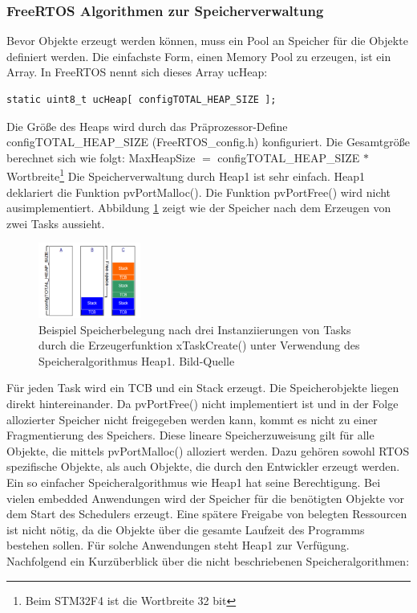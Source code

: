 \subsubsection{FreeRTOS Algorithmen zur Speicherverwaltung}
Bevor Objekte erzeugt werden können, muss ein Pool an Speicher für die Objekte definiert werden. Die einfachste Form, einen Memory Pool zu erzeugen, ist ein Array. In FreeRTOS nennt sich dieses Array ucHeap:
\begin{lstlisting}[numbers = none]
static uint8_t ucHeap[ configTOTAL_HEAP_SIZE ];
\end{lstlisting}
Die Größe des Heaps wird durch das Prä\-pro\-zes\-sor-Define configTOTAL\_HEAP\_SIZE (FreeRTOS\_config.h) konfiguriert. Die Gesamtgröße berechnet sich wie folgt:
\newline
\newline
MaxHeapSize $=$ configTOTAL\_HEAP\_SIZE $\ast$ Wortbreite\footnote{Beim STM32F4 ist die Wortbreite 32 bit} 
\newline
\newline
Die Speicherverwaltung durch Heap1 ist sehr einfach.\newline 
Heap1 deklariert die Funktion pvPortMalloc(). Die Funktion pvPortFree() wird nicht ausimplementiert. Abbildung \ref{fig:Heap1} zeigt wie der Speicher nach dem Erzeugen von zwei Tasks aussieht. 
\begin{figure}[htb]
	\centering
		\includegraphics[width=0.3\textwidth]{Pictures/FreeRTOSOrg/heap1Alg.png}
	\caption{Beispiel Speicherbelegung nach drei Instanziierungen von Tasks durch die Erzeugerfunktion xTaskCreate() unter Verwendung des Speicheralgorithmus Heap1. Bild-Quelle~\protect{}}
	\label{fig:Heap1}
\end{figure}
Für jeden Task wird ein TCB und ein Stack erzeugt. Die Speicherobjekte liegen direkt hintereinander. Da pvPortFree() nicht implementiert ist und in der Folge allozierter Speicher nicht freigegeben werden kann, kommt es nicht zu einer Fragmentierung des Speichers. Diese lineare Speicherzuweisung gilt für alle Objekte, die mittels pvPortMalloc() alloziert werden. Dazu gehören sowohl RTOS spezifische Objekte, als auch Objekte, die durch den Entwickler erzeugt werden. Ein so einfacher Speicheralgorithmus wie Heap1 hat seine Berechtigung. Bei vielen embedded Anwendungen wird der Speicher für die be\-nö\-tig\-ten Objekte vor dem Start des Schedulers erzeugt. Eine spätere Freigabe von belegten Ressourcen ist nicht nötig, da die Objekte über die gesamte Laufzeit des Programms bestehen sollen. Für solche Anwendungen steht Heap1 zur Verfügung. Nachfolgend ein Kurz\-über\-blick über die nicht beschriebenen Speicheralgorithmen:  
